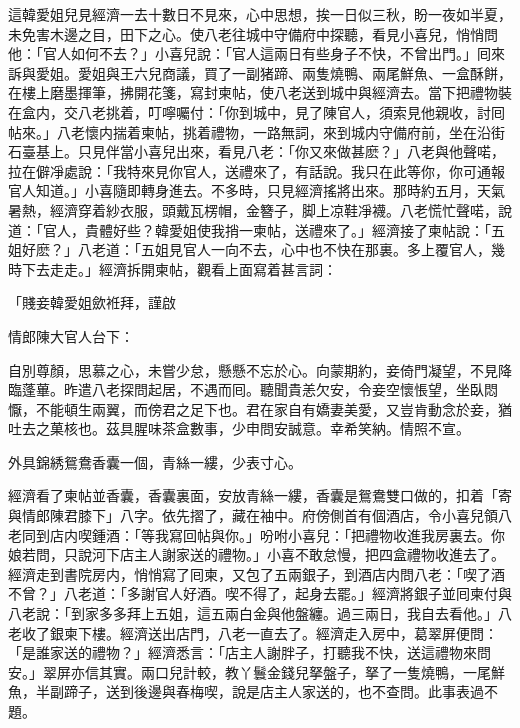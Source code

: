 這韓愛姐兒見經濟一去十數日不見來，心中思想，挨一日似三秋，盼一夜如半夏，未免害木邊之目，田下之心。使八老往城中守備府中探聽，看見小喜兒，悄悄問他：「官人如何不去？」小喜兒說：「官人這兩日有些身子不快，不曾出門。」囘來訴與愛姐。愛姐與王六兒商議，買了一副猪蹄、兩隻燒鴨、兩尾鮮魚、一盒酥餅，在樓上磨墨揮筆，拂開花箋，寫封柬帖，使八老送到城中與經濟去。當下把禮物裝在盒内，交八老挑着，叮嚀囑付：「你到城中，見了陳官人，須索見他親收，討囘帖來。」八老懷内揣着柬帖，挑着禮物，一路無詞，來到城内守備府前，坐在沿街石臺基上。只見伴當小喜兒出來，看見八老：「你又來做甚麽？」八老與他聲喏，拉在僻凈處說：「我特來見你官人，送禮來了，有話說。我只在此等你，你可通報官人知道。」小喜隨即轉身進去。不多時，只見經濟搖將出來。那時約五月，天氣暑熱，經濟穿着紗衣服，頭戴瓦楞帽，金簪子，脚上凉鞋凈襪。八老慌忙聲喏，說道：「官人，貴體好些？韓愛姐使我捎一柬帖，送禮來了。」經濟接了柬帖說：「五姐好麽？」八老道：「五姐見官人一向不去，心中也不快在那裏。多上覆官人，幾時下去走走。」經濟拆開柬帖，觀看上面寫着甚言詞：

\begin{myquote}[\markfont]
「賤妾韓愛姐歛袵拜，謹啟

情郎陳大官人台下：

自別尊顏，思慕之心，未嘗少怠，懸懸不忘於心。向蒙期約，妾倚門凝望，不見降臨蓬蓽。昨遣八老探問起居，不遇而囘。聽聞貴恙欠安，令妾空懷悵望，坐臥悶懨，不能頓生兩翼，而傍君之足下也。君在家自有嬌妻美愛，又豈肯動念於妾，猶吐去之菓核也。茲具腥味茶盒數事，少申問安誠意。幸希笑納。情照不宣。

外具錦綉鴛鴦香囊一個，青絲一縷，少表寸心。

\end{myquote}

經濟看了柬帖並香囊，香囊裏面，安放青絲一縷，香囊是鴛鴦雙口做的，扣着「寄與情郎陳君膝下」八字。依先摺了，藏在袖中。府傍側首有個酒店，令小喜兒領八老同到店内喫鍾酒：「等我寫回帖與你。」吩咐小喜兒：「把禮物收進我房裏去。你娘若問，只說河下店主人謝家送的禮物。」小喜不敢怠慢，把四盒禮物收進去了。經濟走到書院房内，悄悄寫了囘柬，又包了五兩銀子，到酒店内問八老：「喫了酒不曾？」八老道：「多謝官人好酒。喫不得了，起身去罷。」經濟將銀子並囘柬付與八老說：「到家多多拜上五姐，這五兩白金與他盤纏。過三兩日，我自去看他。」八老收了銀柬下樓。經濟送出店門，八老一直去了。經濟走入房中，葛翠屏便問：「是誰家送的禮物？」經濟悉言：「店主人謝胖子，打聽我不快，送這禮物來問安。」翠屏亦信其實。兩口兒計較，教丫鬟金錢兒拏盤子，拏了一隻燒鴨，一尾鮮魚，半副蹄子，送到後邊與春梅喫，說是店主人家送的，也不查問。此事表過不題。

